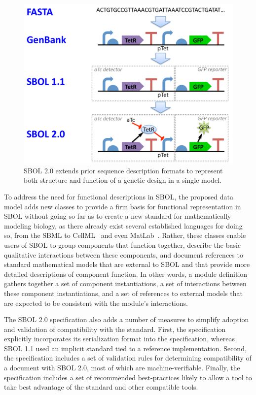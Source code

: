 \begin{figure}
\centering
\includegraphics[width=5in]{images/format-comparison.pdf}
\caption{SBOL 2.0 extends prior sequence description formats to represent both structure and function of a genetic design in a single model.}
\label{f:sequence}
\end{figure}

To address the need for functional descriptions in SBOL, the proposed data model adds new classes to provide a firm basis for functional representation in SBOL without going so far as to create a new standard for mathematically modeling biology, as there already exist several established languages for doing so, from the SBML to CellML~\cite{CellML} and even MatLab~\cite{matlab}. Rather, these classes enable users of SBOL to group components that function together, describe the basic qualitative interactions between these components, and document references to standard mathematical models that are external to SBOL and that provide more detailed descriptions of component function. In other words, a module definition gathers together a set of component instantiations, a set of interactions between these component instantiations, and a set of references to external models that are expected to be consistent with the module's interactions.

The SBOL 2.0 specification also adds a number of measures to simplify adoption and validation of compatibility with the standard.
First, the specification explicitly incorporates its serialization format into the specification, whereas SBOL 1.1 used an implicit standard tied to a reference implementation.
Second, the specification includes a set of validation rules for determining compatibility of a document with SBOL 2.0, most of which are machine-verifiable.
Finally, the specification includes a set of recommended best-practices likely to allow a tool to take best advantage of the standard and other compatible tools.

